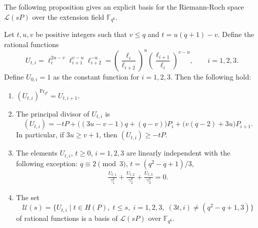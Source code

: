 \documentclass[entropy,article,submit,pdftex,moreauthors]{Definitions/mdpi}
\newcommand{\Frob}{{\mathrm{Fr}_{q^2}}}
\begin{document}
The following proposition gives an explicit basis for the Riemann-Roch space $\mathscr{L}(sP)$ over the extension field $\mathbb{F}_{q^6}$.
\begin{Proposition} \label{pr:Uti-props}
Let $t,u,v$ be positive integers such that $v\leq q$ and $t=u(q+1)-v$. Define the rational functions
\[U_{t,i} = \ell_i^{2u-v}\ell_{i+1}^{v-u}\ell_{i+2}^{-u} = \left(\frac{\ell_i}{\ell_{i+2}}\right)^u\left(\frac{\ell_{i+1}}{\ell_i}\right)^{v-u}, \qquad i=1,2,3.\]
Define $U_{0,i}=1$ as the constant function for $i=1,2,3$. Then the following hold:
\begin{enumerate}[label=(\roman*)]
\item $(U_{t,i})^\Frob = U_{t,i+1}$. 
\item The principal divisor of $U_{t,i}$ is 
\[(U_{t,i}) = -tP + \big((3u-v-1)q+(q-v)\big) P_i + \big(v(q-2)+3u\big) P_{i+1}.\]
In particular, if $3u\geq v+1$, then $(U_{t,i}) \geq -tP$. 
\item The elements $U_{t,i}$, $t\geq 0$, $i=1,2,3$ are linearly independent with the following exception: $q\equiv 2 \pmod{3}$, $t=(q^2-q+1)/3$, 
\begin{align} \label{eq:U-lin-dep}
\frac{U_{t,1}}{\gamma_{1}^q} + \frac{U_{t,2}}{\gamma_{2}^q} + \frac{U_{t,3}}{\gamma_{3}^q} =0.
\end{align}
\item The set
\[\mathcal{U}(s) = \{U_{t,i} \mid t\in H(P), \; t\leq s, \; i=1,2,3, \; (3t,i) \neq (q^2-q+1,3)\}\]
of rational functions is a basis of $\mathscr{L}(sP)$ over $\mathbb{F}_{q^6}$. 
\end{enumerate}
\end{Proposition}
\end{document}
